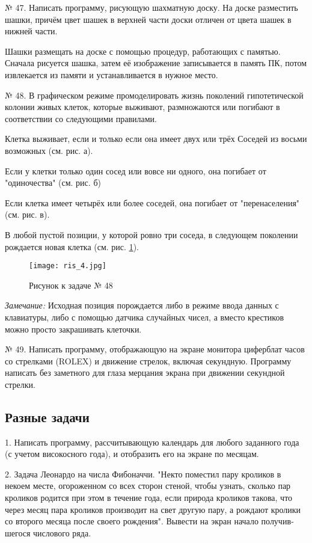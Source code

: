 № 47. Написать программу, рисующую шахматную доску. На доске разместить шашки, причём цвет шашек в верхней части доски отличен от цвета шашек в нижней части.

Шашки размещать на доске с помощью процедур, работающих с памятью. Сначала рисуется шашка, затем её изображение записывается в память ПК, потом извлекается из памяти и устанав­ливается в нужное место.

№ 48. В графическом режиме промоделировать жизнь поко­лений гипотетической колонии живых клеток, которые выживают, размножаются или погибают в соответствии со следующими прави­лами.

Клетка выживает, если и только если она имеет двух или трёх Соседей из восьми возможных (см. рис. а).
 
Если у клетки только один сосед или вовсе ни одного, она поги­бает от "одиночества" (см. рис. б)

Если клетка имеет четырёх или более соседей, она погибает от "перенаселения" (см. рис. в).

В любой пустой позиции, у которой ровно три соседа, в следу­ющем поколении рождается новая клетка (см. рис. \ref{ris3}).
\begin{figure}[!hb]
\centerline{
\texttt{[image: ris\_4.jpg]}}
\caption{Рисунок к задаче № 48}
\label{ris3}
\end{figure}

{\it Замечание:} Исходная позиция порождается либо в режиме вво­да данных с клавиатуры, либо с помощью датчика случайных чисел, а вместо крестиков можно просто закрашивать клеточки.

№ 49. Написать программу, отображающую на экране монитора циферблат часов со стрелками (ROLEX) и движение стрелок, включая секундную. Программу написать без заметного для глаза мерцания экрана при движении секундной стрелки.

\subsection{Разные задачи}

1. Написать программу, рассчитывающую календарь для любого заданного года (с учетом високосного года), и отобразить его на экране по месяцам.

2. Задача Леонардо на числа Фибоначчи. "Некто поместил пару кроликов в некоем месте, огороженном со всех сторон стеной, чтобы узнать, сколько пар кроликов родится при этом в течение года, если природа кроликов такова, что через месяц пара кроликов производит на свет другую пару, а рождают кролики со второго месяца после своего рождения". Вывести на экран начало получив­шегося числового ряда.


